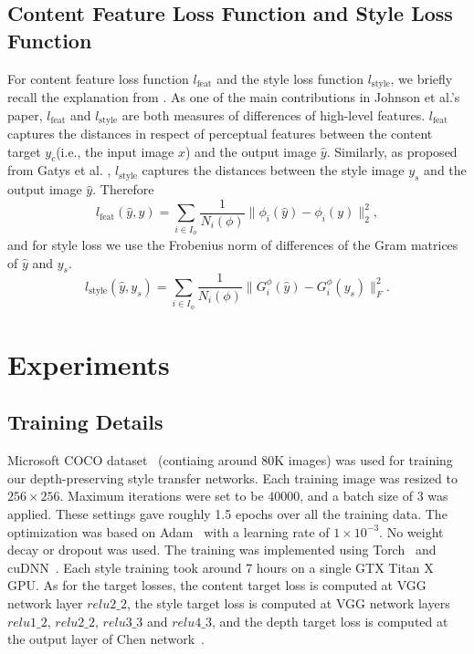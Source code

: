 \documentclass[10pt,twocolumn,letterpaper]{article}
\begin{document}
\subsection{Content Feature Loss Function and Style Loss Function}
For content feature loss function $l_\text{feat}$ and the style loss function $l_\text{style}$, we briefly recall the explanation from \cite{johnson2016perceptual}. As one of the main contributions in Johnson et al.'s paper, $l_\text{feat}$ and $l_\text{style}$ are both measures of differences of high-level features. $l_\text{feat}$ captures the distances in respect of perceptual features between the content target $y_c$(i.e., the input image $x$) and the output image $\hat y$. Similarly, as proposed from Gatys et al. \cite{gatys2016image}, $l_\text{style}$ captures the distances between the style image $y_s$ and the output image $\hat y$. 
Therefore
\[ l_\text{feat}(\hat y, y) = \sum_{i \in I_\phi} \frac{1}{N_i(\phi)}\|\phi_i(\hat y) - \phi_i(y)\|_2^2, \]
and for style loss we use the Frobenius norm of differences of the Gram matrices of $\hat y$ and $y_s$.
\[ l_\text{style}(\hat y, y_s) = \sum_{i \in I_\phi} \frac{1}{N_i(\phi)}\|G^\phi_i(\hat y) - G^\phi_i(y_s)\|_F^2. \]
\section{Experiments}

\subsection{Training Details}

Microsoft COCO dataset~\cite{lin2014microsoft} (contiaing around 80K images) was used for training our depth-preserving style transfer networks. Each training image was resized to $256\times256$. Maximum iterations were set to be $40000$, and a batch size of 3 was applied. These settings gave roughly 1.5 epochs over all the training data. The optimization was based on Adam~\cite{kingma2014adam} with a learning rate of $1\times10^{-3}$. No weight decay or dropout was used. The training was implemented using Torch~\cite{collobert2011torch7} and cuDNN~\cite{chetlur2014cudnn}. Each style training took around 7 hours on a single GTX Titan X GPU. As for the target losses, the content target loss is computed at VGG network layer $relu2\_2$, the style target loss is computed at VGG network layers $relu1\_2$, $relu2\_2$, $relu3\_3$ and $relu4\_3$, and the depth target loss is computed at the output layer of Chen \etal network~\cite{chen2016single}.
\end{document}
